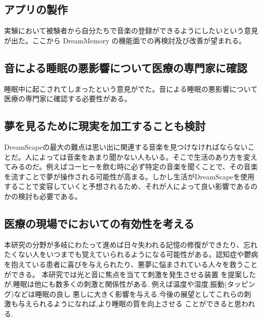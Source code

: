 \subsection{アプリの製作}
実験において被験者から自分たちで音楽の登録ができるようにしたいという意見が出た。ここから DreamMemory の機能面での再検討及び改善が望まれる。

\subsection{音による睡眠の悪影響について医療の専門家に確認}
睡眠中に起こされてしまったという意見がでた。音による睡眠の悪影響について医療の専門家に確認する必要性がある。


\subsection{夢を見るために現実を加工することも検討}
DreamScapeの最大の難点は思い出に関連する音楽を見つけなければならないことだ。人によっては音楽をあまり聞かない人もいる。そこで生活のあり方を変えてみるのだ。例えばコーヒーを飲む時に必ず特定の音楽を聞くことで、その音楽を流すことで夢が操作される可能性が高まる。しかし生活がDreamScapeを使用することで変容していくと予想されるため、それが人によって良い影響であるのかの検討も必要である。

\subsection{医療の現場でにおいての有効性を考える}
本研究の分野が多岐にわたって進めば日々失われる記憶の修復ができたり、忘れたくない人をいつまでも覚えていられるようになる可能性がある。認知症や鬱病を抱えている患者に喜びを与えられたり、悪夢に悩まされている人々を救うことができる。
本研究では光と音に焦点を当てて刺激を発生させる装置 を提案したが,睡眠は他にも数多くの刺激と関係性がある. 例えば温度や湿度,振動(タッピング)などは睡眠の良し 悪しに大きく影響を与える.今後の展望としてこれらの刺 激も与えられるようになれば,より睡眠の質を向上させる ことができると思われる.
